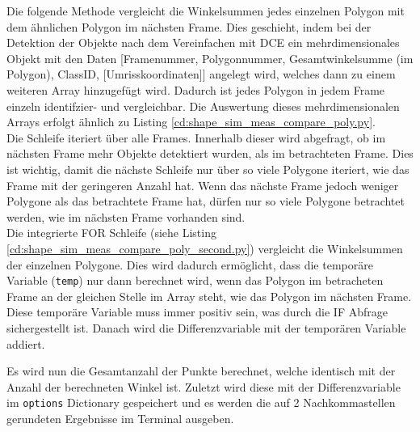 {	Die folgende Methode vergleicht die Winkelsummen jedes einzelnen Polygon mit dem ähnlichen Polygon im nächsten Frame. Dies geschieht, indem bei der Detektion der Objekte nach dem Vereinfachen mit DCE ein mehrdimensionales Objekt mit den Daten [Framenummer, Polygonnummer, Gesamtwinkelsumme (im Polygon), ClassID, [Umrisskoordinaten]] angelegt wird, welches dann zu einem weiteren Array hinzugefügt wird. Dadurch ist jedes Polygon in jedem Frame einzeln identifzier- und vergleichbar. 
	Die Auswertung dieses mehrdimensionalen Arrays erfolgt ähnlich zu Listing \ref{cd:shape_sim_meas_compare_poly.py}.\\
	Die Schleife iteriert über alle Frames. Innerhalb dieser wird abgefragt, ob im nächsten Frame mehr Objekte detektiert wurden, als im betrachteten Frame. Dies ist wichtig, damit die nächste Schleife nur über so viele Polygone iteriert, wie das Frame mit der geringeren Anzahl hat. Wenn das nächste Frame jedoch weniger Polygone als das betrachtete Frame hat, dürfen nur so viele Polygone betrachtet werden, wie im nächsten Frame vorhanden sind. \\
	
	Die integrierte FOR Schleife (siehe Listing \ref{cd:shape_sim_meas_compare_poly_second.py}) vergleicht die Winkelsummen der einzelnen Polygone. Dies wird dadurch ermöglicht, dass die temporäre Variable (\lstinline|temp|) nur dann berechnet wird, wenn das Polygon im betracheten Frame an der gleichen Stelle im Array steht, wie das Polygon im nächsten Frame. Diese temporäre Variable muss immer positiv sein, was durch die IF Abfrage sichergestellt ist. Danach wird die Differenzvariable mit der temporären Variable addiert. 
	
	Es wird nun die Gesamtanzahl der Punkte berechnet, welche identisch mit der Anzahl der berechneten Winkel ist. Zuletzt wird diese mit der Differenzvariable im \lstinline|options| Dictionary gespeichert und es werden die auf 2 Nachkommastellen gerundeten Ergebnisse im Terminal ausgeben.

}







